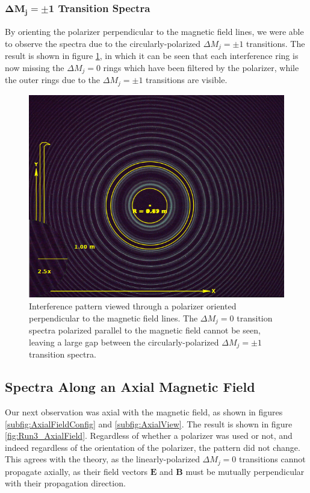 \documentclass[twocolumn]{article}
\begin{document}
		\subsubsection{$\mathbf{\Delta M_j = \pm1}$ Transition Spectra}
			By orienting the polarizer perpendicular to the magnetic field lines, we were able to observe the spectra due to the circularly-polarized $\Delta M_j = \pm1$ transitions.
			The result is shown in figure \ref{fig:Run2_0Deg}, in which it can be seen that each interference ring is now missing the $\Delta M_j=0$ rings which have been filtered by the polarizer, while the outer rings due to the $\Delta M_j = \pm1$ transitions are visible.
			
		\begin{figure}
			\centering
			\includegraphics[width=0.55\linewidth]{Images/Run2_PerpendicularPolarizer}
			\caption{Interference pattern viewed through a polarizer oriented perpendicular to the magnetic field lines. The $\Delta M_j = 0$ transition spectra polarized parallel to the magnetic field cannot be seen, leaving a large gap between the circularly-polarized $\Delta M_j = \pm1$ transition spectra.}
			\label{fig:Run2_0Deg}
		\end{figure}

		
	\subsection{Spectra Along an Axial Magnetic Field}
		Our next observation was axial with the magnetic field, as shown in figures \ref{subfig:AxialFieldConfig} and \ref{subfig:AxialView}.
		The result is shown in figure \ref{fig:Run3_AxialField}.
		Regardless of whether a polarizer was used or not, and indeed regardless of the orientation of the polarizer, the pattern did not change.
		This agrees with the theory, as the linearly-polarized $\Delta M_j = 0$ transitions cannot propagate axially, as their field vectors $\mathbf{E}$ and $\mathbf{B}$ must be mutually perpendicular with their propagation direction.
		
\end{document}
